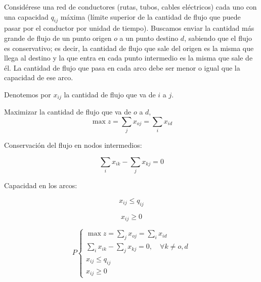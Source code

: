 \begin{Ejem} Consid\'erese una red de conductores (rutas, tubos, cables el\'ectricos) cada uno con una capacidad $q_{ij}$ m\'axima (l\'imite superior de la cantidad de flujo que puede pasar por el conductor por unidad de tiempo). Buscamos enviar la cantidad m\'as grande de flujo de un punto origen $o$ a un punto destino $d$, sabiendo que el flujo es conservativo; es decir, la cantidad de flujo que sale del origen es la misma que llega al destino y la que entra en cada punto intermedio es la misma que sale de \'el. La cantidad de flujo que pasa en cada arco debe ser menor o igual que la capacidad de ese arco.

\begin{tcolorbox}[title=Variables de decisi\'on.] Denotemos por $x_{ij}$ la cantidad de flujo que va de $i$ a $j$.
\end{tcolorbox}

\begin{tcolorbox}[title=Funci\'on objetivo.] Maximizar la cantidad de flujo que va de $o$ a $d$,
\[
\max z = \sum_j x_{oj} = \sum_i x_{id}
\]
\end{tcolorbox}

\begin{tcolorbox}[title=Restricciones.]
Conservaci\'on del flujo en nodos intermedios:

\[
\sum_i x_{ik} - \sum_j x_{kj} = 0
\]

Capacidad en los arcos:

\[
x_{ij} \le q_{ij}
\]

\[
x_{ij} \ge 0
\]
\end{tcolorbox}

\begin{tcolorbox}[title=El problema de flujo m\'aximo se plantea entonces como:]
\[
P
\begin{cases}
\max z = \sum_j x_{oj} = \sum_i x_{id} \\
\sum_i x_{ik} - \sum_j x_{kj} = 0, \quad \forall k \ne o,d \\
x_{ij} \le q_{ij} \\
x_{ij} \ge 0
\end{cases}
\]
\end{tcolorbox}

\end{Ejem}

